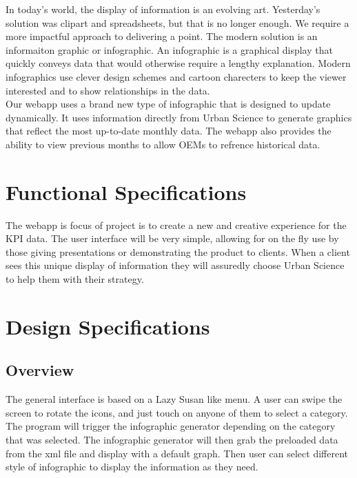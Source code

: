 \documentclass[11pt,a4paper,oneside]{article}
\begin{document}
In today's world, the display of information is an evolving art.  Yesterday's solution was clipart and spreadsheets, but that is no longer enough.  We require a more impactful approach to delivering a point.  The modern solution is an informaiton graphic or infographic.  An infographic is a graphical display that quickly conveys data that would otherwise require a lengthy explanation.  Modern infographics use clever design schemes and cartoon charecters to keep the viewer interested and to show relationships in the data.\\


Our webapp uses a brand new type of infographic that is designed to update dynamically.  It uses information directly from Urban Science to generate graphics that reflect the most up-to-date monthly data.  The webapp also provides the ability to view previous months to allow OEMs to refrence historical data.\\


\section{Functional Specifications}

The webapp is focus of project is to create a new and creative experience for the KPI data. The user interface will be very simple, allowing for on the fly use by those giving presentations or demonstrating the product to clients. When a client sees this unique display of information they will assuredly choose Urban Science to help them with their strategy.\\




\section{Design Specifications}

\subsection{Overview}

The general interface is based on a Lazy Susan like menu. A user can swipe the screen to rotate the icons, and just touch on anyone of them to select a category. The program will trigger the infographic generator depending on the category that was selected. The infographic generator will then grab the preloaded data from the xml file and display with a default graph. Then user can select different style of infographic to display the information as they need.\\
\end{document}
